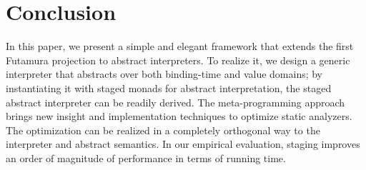 \section{Conclusion}

In this paper, we present a simple and elegant framework that extends the first
Futamura projection to abstract interpreters.
To realize it, we design a generic interpreter that abstracts over both
binding-time and value domains; by instantiating it with staged monads for
abstract interpretation, the staged abstract interpreter can be readily derived.
The meta-programming approach brings new insight and implementation techniques
to optimize static analyzers. The optimization can be realized in a completely
orthogonal way to the interpreter and abstract semantics.
In our empirical evaluation, staging improves an order of magnitude of
performance in terms of running time.
